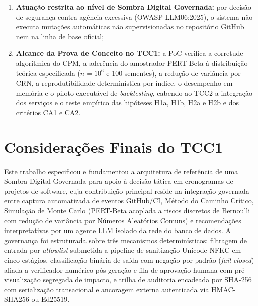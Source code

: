 \documentclass[12pt,openany,oneside,a4paper,english,brazilian,sumario=tradicional]{abntex2}
\begin{document}
\begin{enumerate}
  \item \textbf{Atuação restrita ao nível de Sombra Digital Governada:} por decisão de segurança contra agência excessiva (OWASP LLM06:2025), o sistema não executa mutações automáticas não supervisionadas no repositório GitHub nem na linha de base oficial;
  \item \textbf{Alcance da Prova de Conceito no TCC1:} a PoC verifica a corretude algorítmica do CPM, a aderência do amostrador PERT-Beta à distribuição teórica especificada ($n=10^6$ e 100 sementes), a redução de variância por CRN, a reprodutibilidade determinística por índice, o desempenho em memória e o piloto executável de \textit{backtesting}, cabendo ao TCC2 a integração dos serviços e o teste empírico das hipóteses H1a, H1b, H2a e H2b e dos critérios CA1 e CA2.
\end{enumerate}

\section{Considerações Finais do TCC1}

Este trabalho especificou e fundamentou a arquitetura de referência de uma Sombra Digital Governada para apoio à decisão tática em cronogramas de projetos de software, cuja contribuição principal reside na integração governada entre captura automatizada de eventos GitHub/CI, Método do Caminho Crítico, Simulação de Monte Carlo (PERT-Beta acoplada a riscos discretos de Bernoulli com redução de variância por Números Aleatórios Comuns) e recomendações interpretativas por um agente LLM isolado da rede do banco de dados. A governança foi estruturada sobre três mecanismos determinísticos: filtragem de entrada por \textit{allowlist} submetida a pipeline de sanitização Unicode NFKC em cinco estágios, classificação binária de saída com negação por padrão (\textit{fail-closed}) aliada a verificador numérico pós-geração e fila de aprovação humana com pré-visualização segregada de impacto, e trilha de auditoria encadeada por SHA-256 com serialização transacional e ancoragem externa autenticada via HMAC-SHA256 ou Ed25519.
\end{document}
